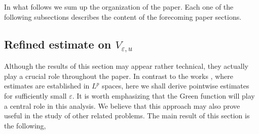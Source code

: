 \documentclass[11pt,reqno]{article}
\newtheorem{teo}{Theorem}[section]
\numberwithin{equation}{section}
\newcommand\R{\mathbb R}
\newcommand\e\varepsilon
\newcommand{\Ma}{\color{blue}}
\newcommand{\Ying}{\color{red}}
\begin{document}
 
    
   

  In what follows we sum up the organization of the paper. Each one of the following subsections describes the content of the forecoming paper sections.

  \subsection{Refined estimate on $V_{\e,u}$}\label{is0}
Although the results of this section may appear rather technical, they actually play a crucial role throughout the paper. In contrast to the works \cite{afhl,alm1,alm2}, where estimates are established in $L^p$ spaces, here we shall derive pointwise estimates for sufficiently small $\e$. It is worth emphasizing that the Green function will play a central role in this analysis. We believe that this approach may also prove useful in the study of other related problems. The main result of this section is the following,
\end{document}
